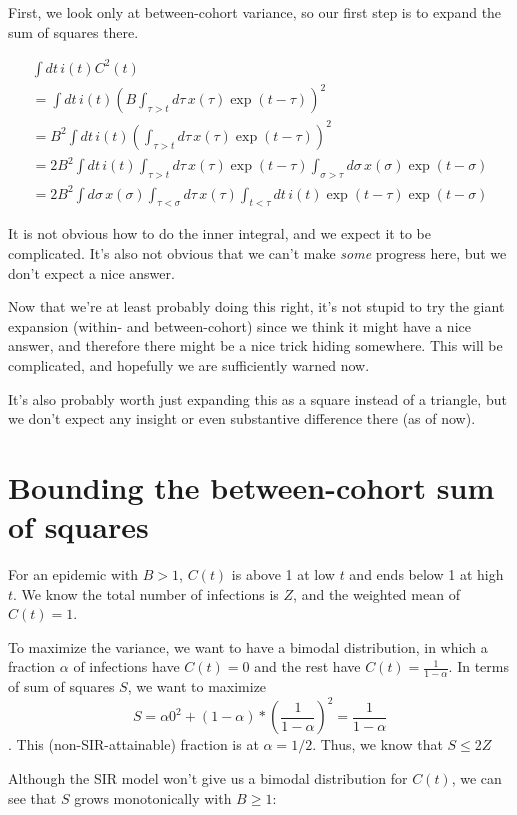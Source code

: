 \documentclass[12pt]{article}
\begin{document}
First, we look only at between-cohort variance, so our first step is to expand the sum of squares there.

\begin{eqnarray}
\int{dt\, i(t) C^2(t)}
	\\ = \int{dt\, i(t) \left(
		B \int_{\tau>t}{d\tau\, x(\tau) \exp(t-\tau)}
	\right)^2}
	\\ = B^2 \int{dt\, i(t) \left(
		\int_{\tau>t}{d\tau\, x(\tau) \exp(t-\tau)}
	\right)^2}
	\\ =  2B^2 \int{dt\, i(t)
		\int_{\tau>t}{d\tau\,  x(\tau) \exp(t-\tau)
			\int_{\sigma>\tau}{d\sigma\, x(\sigma)\exp(t-\sigma)}
		}
	}
	\\ =  2B^2 \int{
		d\sigma\, x(\sigma) \int_{\tau<\sigma}{
			d\tau\,  x(\tau) \int_{t<\tau}{
				dt\, i(t) \exp(t-\tau) \exp(t-\sigma)
			}
		}
	}
\end{eqnarray}

It is not obvious how to do the inner integral, and we expect it to be complicated. It's also not obvious that we can't make \emph{some} progress here, but we don't expect a nice answer.

Now that we're at least probably doing this right, it's not stupid to try the giant expansion (within- and between-cohort) since we think it might have a nice answer, and therefore there might be a nice trick hiding somewhere. This will be complicated, and hopefully we are sufficiently warned now.

It's also probably worth just expanding this as a square instead of a triangle, but we don't expect any insight or even substantive difference there (as of now).

\section{Bounding the between-cohort sum of squares}
For an epidemic with $B>1$, $C(t)$ is above 1 at low $t$ and ends below 1 at high $t$. We know the total number of infections is $Z$, and the weighted mean of $C(t) =1$.

To maximize the variance, we want to have a bimodal distribution, in which a fraction $\alpha$ of infections have $C(t) = 0$ and the rest have $C(t) = \frac{1}{1-\alpha}$.
In terms of sum of squares $S$, we want to maximize
$$ S = \alpha 0^2 + (1-\alpha)*(\frac{1}{1-\alpha})^2 = \frac{1}{1-\alpha}$$.
This (non-SIR-attainable) fraction is at $\alpha = 1/2$.
Thus, we know that $S \leq 2Z$

Although the SIR model won't give us a bimodal distribution for $C(t)$, we can see that $S$ grows monotonically with $B \geq 1$:
\end{document}
